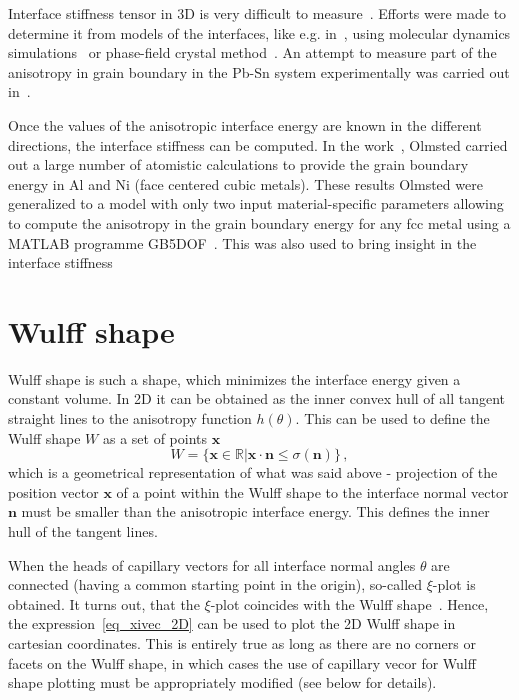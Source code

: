 Interface stiffness tensor in 3D is very difficult to measure~\cite{Du2007}. Efforts were made to determine it from models of the interfaces, like e.g. in~\cite{Du2007}, using molecular dynamics simulations~\cite{Trautt2005,Abdeljawad2018} or phase-field crystal method~\cite{Blixt2022}. An attempt to measure part of the anisotropy in grain boundary in the Pb-Sn system experimentally was carried out in~\cite{Rowenhorst2005}. 

Once the values of the anisotropic interface energy are known in the different directions, the interface stiffness can be computed. In the work~\cite{Olmsted2009}, Olmsted carried out a large number of atomistic calculations to provide the grain boundary energy in Al and Ni (face centered cubic metals). These results Olmsted were generalized to a model with only two input material-specific parameters allowing to compute the anisotropy in the grain boundary energy for any fcc metal using a MATLAB programme GB5DOF~\cite{Bulatov2014}. This was also used to bring insight in the interface stiffness~\cite{Moore2021}

\section{Wulff shape}
Wulff shape is such a shape, which minimizes the interface energy given a constant volume. In 2D it can be obtained as the inner convex hull of all tangent straight lines to the anisotropy function $h(\theta)$. This can be used to define the Wulff shape $W$ as a set of points $\bm{x}$
\begin{equation}
    W = \{ \bm{x}\in\mathbb{R}| \bm{x}\cdot\bm{n}\leq \sigma(\bm{n})\} \,,
\end{equation}
which is a geometrical representation of what was said above - projection of the position vector $\bm{x}$ of a point within the Wulff shape to the interface normal vector $\bm{n}$ must be smaller than the anisotropic interface energy. This defines the inner hull of the tangent lines.

When the heads of capillary vectors for all interface normal angles $\theta$ are connected (having a common starting point in the origin), so-called $\xi$-plot is obtained. It turns out, that the $\xi$-plot coincides with the Wulff shape~\cite{Hoffman1972}. Hence, the expression~\eqref{eq_xivec_2D} can be used to plot the 2D Wulff shape in cartesian coordinates. This is entirely true as long as there are no corners or facets on the Wulff shape, in which cases the use of capillary vecor for Wulff shape plotting must be appropriately modified (see below for details).

